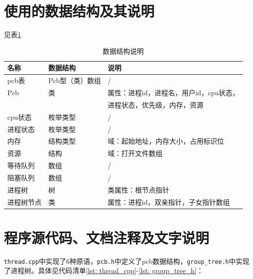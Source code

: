 \documentclass[11pt]{article}
\begin{document}
\section{使用的数据结构及其说明}
见表\ref{tab: data_structure}
\begin{table}[htbp]
\centering  %
\begin{tabular}{lll}  %
\hline
名称 & 数据结构 & 说明 \\
\hline  %
pcb表 & Pcb型（类）数组 & / \\
Pcb & 类 & 属性：进程id，进程名，用户id，cpu状态， \\
        & & 进程状态，优先级，内存，资源 \\
cpu状态 & 枚举类型 & / \\
进程状态 & 枚举类型 & / \\
内存 & 结构类型 & 域：起始地址，内存大小，占用标识位 \\
资源 & 结构 & 域：打开文件数组 \\
等待队列 & 数组 & / \\
阻塞队列 & 数组 & / \\
进程树 & 树 & 类属性：根节点指针 \\
进程树节点 & 类 & 属性：进程id，双亲指针，子女指针数组 \\
\hline
\end{tabular}
\caption{数据结构说明\label{tab: data_structure}}
\end{table}

\section{程序源代码、文档注释及文字说明}
\texttt{thread.cpp}中实现了6种原语，\texttt{pcb.h}中定义了pcb数据结构，\texttt{group\_tree.h}中实现了进程树。具体见代码清单\ref{lst: thread_cpp}-\ref{lst: group_tree_h}：
\end{document}
